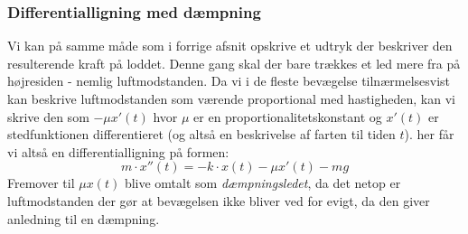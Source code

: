 \subsubsection{Differentialligning med dæmpning}\label{teori: Opstilling af ligning med dampning}
Vi kan på samme måde som i forrige afsnit opskrive et udtryk der beskriver den resulterende kraft på loddet. 
Denne gang skal der bare trækkes et led mere fra på højresiden - nemlig luftmodstanden. 
Da vi i de fleste bevægelse tilnærmelsesvist kan beskrive luftmodstanden som værende proportional med hastigheden, kan vi skrive den som $- \mu x'(t)$ hvor $\mu$ er en proportionalitetskonstant og $x'(t)$ er stedfunktionen differentieret (og altså en beskrivelse af farten til tiden $t$).
her får vi altså en differentialligning på formen:
$$m\cdot x''(t)=-k\cdot x(t)-\mu x'(t) -mg$$
Fremover til $\mu x(t)$ blive omtalt som \textit{dæmpningsledet}, da det netop er luftmodstanden der gør at bevægelsen ikke bliver ved for evigt, da den giver anledning til en dæmpning. 